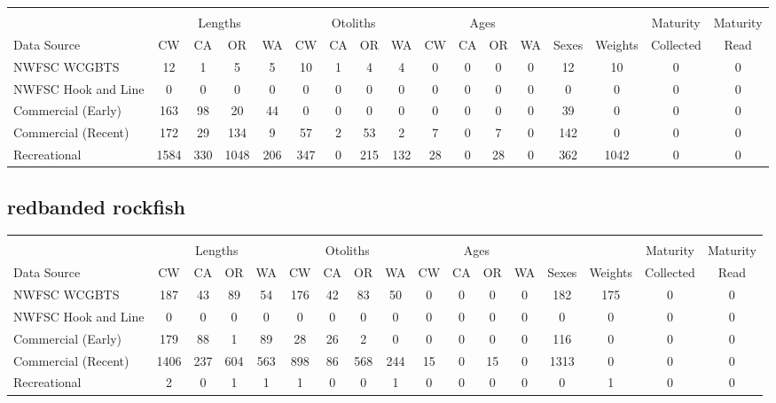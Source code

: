 \documentclass[12pt,]{article}
\begin{document}
\begin{table}[ht]
\centering
\begingroup\fontsize{10pt}{10pt}\selectfont
\begin{tabular}{|l|cccc|cccc|cccc|c|c|c|c|}
  \hline
 &  &  &  &  &  &  &  &  &  &  &  &  &  &  &  &  \\ 
   & \multicolumn{4}{c}{Lengths} &  \multicolumn{4}{c}{Otoliths} & \multicolumn{4}{c}{Ages} &  & & Maturity & Maturity\\
 Data Source & CW & CA & OR & WA & CW & CA & OR & WA & CW & CA & OR & WA & Sexes & Weights & Collected & Read\\
 \hline
NWFSC WCGBTS & 12 & 1 & 5 & 5 & 10 & 1 & 4 & 4 & 0 & 0 & 0 & 0 & 12 & 10 & 0 & 0 \\ 
  NWFSC Hook and Line & 0 & 0 & 0 & 0 & 0 & 0 & 0 & 0 & 0 & 0 & 0 & 0 & 0 & 0 & 0 & 0 \\ 
  Commercial (Early) & 163 & 98 & 20 & 44 & 0 & 0 & 0 & 0 & 0 & 0 & 0 & 0 & 39 & 0 & 0 & 0 \\ 
  Commercial (Recent) & 172 & 29 & 134 & 9 & 57 & 2 & 53 & 2 & 7 & 0 & 7 & 0 & 142 & 0 & 0 & 0 \\ 
  Recreational & 1584 & 330 & 1048 & 206 & 347 & 0 & 215 & 132 & 28 & 0 & 28 & 0 & 362 & 1042 & 0 & 0 \\ 
   \hline
\end{tabular}
\endgroup
\end{table}

\FloatBarrier  

\newpage  

\subsection{redbanded rockfish}\label{redbanded-rockfish}

\begin{table}[ht]
\centering
\begingroup\fontsize{10pt}{10pt}\selectfont
\begin{tabular}{|l|cccc|cccc|cccc|c|c|c|c|}
  \hline
 &  &  &  &  &  &  &  &  &  &  &  &  &  &  &  &  \\ 
   & \multicolumn{4}{c}{Lengths} &  \multicolumn{4}{c}{Otoliths} & \multicolumn{4}{c}{Ages} &  & & Maturity & Maturity\\
 Data Source & CW & CA & OR & WA & CW & CA & OR & WA & CW & CA & OR & WA & Sexes & Weights & Collected & Read\\
 \hline
NWFSC WCGBTS & 187 & 43 & 89 & 54 & 176 & 42 & 83 & 50 & 0 & 0 & 0 & 0 & 182 & 175 & 0 & 0 \\ 
  NWFSC Hook and Line & 0 & 0 & 0 & 0 & 0 & 0 & 0 & 0 & 0 & 0 & 0 & 0 & 0 & 0 & 0 & 0 \\ 
  Commercial (Early) & 179 & 88 & 1 & 89 & 28 & 26 & 2 & 0 & 0 & 0 & 0 & 0 & 116 & 0 & 0 & 0 \\ 
  Commercial (Recent) & 1406 & 237 & 604 & 563 & 898 & 86 & 568 & 244 & 15 & 0 & 15 & 0 & 1313 & 0 & 0 & 0 \\ 
  Recreational & 2 & 0 & 1 & 1 & 1 & 0 & 0 & 1 & 0 & 0 & 0 & 0 & 0 & 1 & 0 & 0 \\ 
   \hline
\end{tabular}
\endgroup
\end{table}
\end{document}
